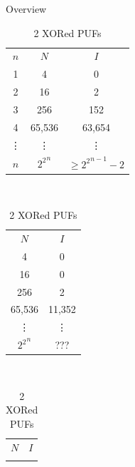 \documentclass[10pt, compress]{beamer}
\begin{document}
\begin{frame}{Overview}

    \begin{table}[H]
    \caption{Function Overview}
    \label{function_overview}    
    \def\arraystretch{1.45}
        \begin{subtable}{0.40\textwidth}
            \centering
            \begin{tabular}{|c|c|c|}
            \hline
            $n$     & $N$       & $I$                       \\ \Xhline{5\arrayrulewidth}
            1       & 4         & 0                         \\ \hline
            2       & 16        & 2                         \\ \hline
            3       & 256       & 152                       \\ \hline
            4       & 65,536    & 63,654                    \\ \hline
            \vdots  & \vdots    & \vdots                    \\ \hline
            $n$     & ${2^2}^n$ & $\geq	{2^2}^{n-1} - 2$    \\ \hline
            \end{tabular}
        \caption{One single PUF}
        \end{subtable}
        ~ 
        \begin{subtable}{0.28\textwidth}
            \centering
            \begin{tabular}{|c|c|}
            \hline
            $N$       & $I$       \\ \Xhline{5\arrayrulewidth}
            4         & 0         \\ \hline
            16        & 0         \\ \hline
            256       & 2         \\ \hline
            65,536    & 11,352    \\ \hline
            \vdots    & \vdots    \\ \hline
            ${2^2}^n$ & ???       \\ \hline
            \end{tabular}
        \caption{2 XORed PUFs}
        \end{subtable}
        ~
        \begin{subtable}{0.23\textwidth}
            \centering
            \begin{tabular}{|c|c|}
            \hline
            $N$       & $I$       \\ \Xhline{5\arrayrulewidth}

\end{tabular}
\end{subtable}
\end{table}
\end{frame}
\end{document}
